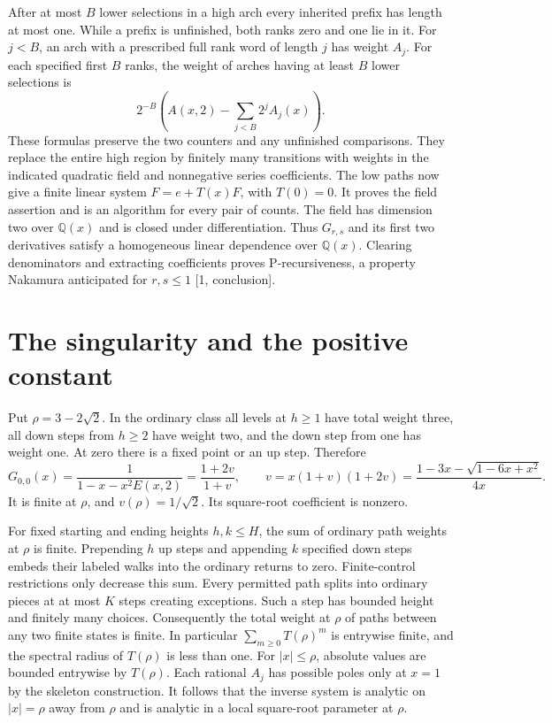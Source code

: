 \documentclass[11pt,letterpaper]{article}
\newcommand{\Q}{\mathbb Q}
\begin{document}
After at most $B$ lower selections in a high arch every inherited prefix has length at most one. While a prefix is unfinished, both ranks zero and one lie in it. For $j<B$, an arch with a prescribed full rank word of length $j$ has weight $A_j$. For each specified first $B$ ranks, the weight of arches having at least $B$ lower selections is
\[
 2^{-B}\left(A(x,2)-\sum_{j<B}2^j A_j(x)\right).
\]
These formulas preserve the two counters and any unfinished comparisons. They replace the entire high region by finitely many transitions with weights in the indicated quadratic field and nonnegative series coefficients. The low paths now give a finite linear system $F=e+T(x)F$, with $T(0)=0$. It proves the field assertion and is an algorithm for every pair of counts. The field has dimension two over $\Q(x)$ and is closed under differentiation. Thus $G_{r,s}$ and its first two derivatives satisfy a homogeneous linear dependence over $\Q(x)$. Clearing denominators and extracting coefficients proves P-recursiveness, a property Nakamura anticipated for $r,s\le1$ [1, conclusion].

\section{The singularity and the positive constant}
Put $\rho=3-2\sqrt2$. In the ordinary class all levels at $h\ge1$ have total weight three, all down steps from $h\ge2$ have weight two, and the down step from one has weight one. At zero there is a fixed point or an up step. Therefore
\[
 G_{0,0}(x)=\frac{1}{1-x-x^2E(x,2)}
           =\frac{1+2v}{1+v},\qquad
 v=x(1+v)(1+2v)=\frac{1-3x-\sqrt{1-6x+x^2}}{4x}.
\]
It is finite at $\rho$, and $v(\rho)=1/\sqrt2$. Its square-root coefficient is nonzero.

For fixed starting and ending heights $h,k\le H$, the sum of ordinary path weights at $\rho$ is finite. Prepending $h$ up steps and appending $k$ specified down steps embeds their labeled walks into the ordinary returns to zero. Finite-control restrictions only decrease this sum. Every permitted path splits into ordinary pieces at at most $K$ steps creating exceptions. Such a step has bounded height and finitely many choices. Consequently the total weight at $\rho$ of paths between any two finite states is finite. In particular $\sum_{m\ge0}T(\rho)^m$ is entrywise finite, and the spectral radius of $T(\rho)$ is less than one. For $|x|\le\rho$, absolute values are bounded entrywise by $T(\rho)$. Each rational $A_j$ has possible poles only at $x=1$ by the skeleton construction. It follows that the inverse system is analytic on $|x|=\rho$ away from $\rho$ and is analytic in a local square-root parameter at $\rho$.
\end{document}
